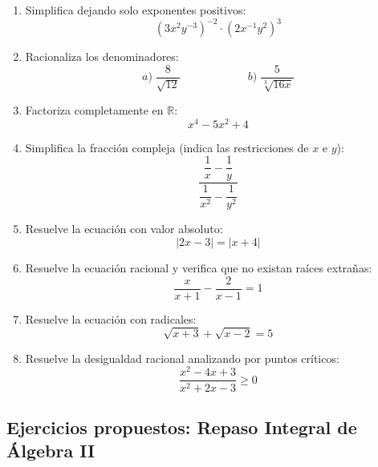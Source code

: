\documentclass[12pt, letterpaper]{article}
\begin{document}
\begin{enumerate}[resume=ejercicios, leftmargin=*]
      \item \facil{} Simplifica dejando solo exponentes positivos:
            $$(3x^2 y^{-3})^{-2} \cdot (2x^{-1} y^2)^3$$

      \item \facil{} Racionaliza los denominadores:
            $$a)\; \frac{8}{\sqrt{12}} \qquad\qquad\qquad b)\; \frac{5}{\sqrt[3]{16x}}$$

      \item \medio{} Factoriza completamente en $\mathbb{R}$:
            $$x^4 - 5x^2 + 4$$

      \item \medio{} Simplifica la fracción compleja (indica las restricciones de $x$ e $y$):
            $$\frac{\dfrac{1}{x} - \dfrac{1}{y}}{\dfrac{1}{x^2} - \dfrac{1}{y^2}}$$

      \item \medio{} Resuelve la ecuación con valor absoluto:
            $$|2x - 3| = |x + 4|$$

      \item \dificil{} Resuelve la ecuación racional y verifica que no existan raíces extrañas:
            $$\frac{x}{x + 1} - \frac{2}{x - 1} = 1$$

      \item \dificil{} Resuelve la ecuación con radicales:
            $$\sqrt{x + 3} + \sqrt{x - 2} = 5$$

      \item \muyDificil{} Resuelve la desigualdad racional analizando por puntos críticos:
            $$\frac{x^2 - 4x + 3}{x^2 + 2x - 3} \ge 0$$
\end{enumerate}

\subsection{Ejercicios propuestos: Repaso Integral de Álgebra II}
\end{document}
